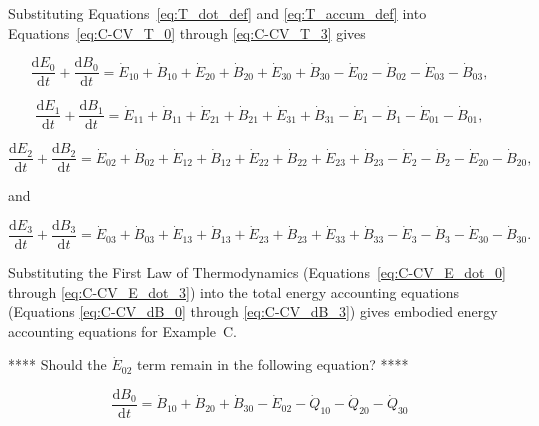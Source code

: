 Substituting Equations~\ref{eq:T_dot_def} 
and \ref{eq:T_accum_def} into 
Equations~\ref{eq:C-CV_T_0} through
\ref{eq:C-CV_T_3} gives

\begin{equation} \label{eq:C-CV_dB_0}
	\frac{\mathrm{d}E_{0}}{\mathrm{d}t}
	+ \frac{\mathrm{d}B_{0}}{\mathrm{d}t}
	= \dot{E}_{10} 
	+ \dot{B}_{10} 
	+ \dot{E}_{20} 
	+ \dot{B}_{20} 
	+ \dot{E}_{30} 
	+ \dot{B}_{30} 
	- \dot{E}_{02} 
	- \dot{B}_{02} 
	- \dot{E}_{03} 
	- \dot{B}_{03},
\end{equation}

\begin{equation} \label{eq:C-CV_dB_1}
	\frac{\mathrm{d}E_{1}}{\mathrm{d}t} 
	+ \frac{\mathrm{d}B_{1}}{\mathrm{d}t} 	 
	= \dot{E}_{11}
	+ \dot{B}_{11}
	+ \dot{E}_{21} 
	+ \dot{B}_{21} 
	+ \dot{E}_{31} 
	+ \dot{B}_{31} 
	- \dot{E}_{1}
	- \dot{B}_{1}
	- \dot{E}_{01} 
	- \dot{B}_{01},
\end{equation}

\begin{equation} \label{eq:C-CV_dB_2}
	\frac{\mathrm{d}E_{2}}{\mathrm{d}t} 
	+ \frac{\mathrm{d}B_{2}}{\mathrm{d}t} 	 
	= \dot{E}_{02} 
	+ \dot{B}_{02} 
	+ \dot{E}_{12}
	+ \dot{B}_{12}
	+ \dot{E}_{22} 
	+ \dot{B}_{22} 
	+ \dot{E}_{23} 
	+ \dot{B}_{23} 
	- \dot{E}_{2} 
	- \dot{B}_{2} 
	- \dot{E}_{20} 
	- \dot{B}_{20},
\end{equation}

\noindent and 

\begin{equation} \label{eq:C-CV_dB_3}
	\frac{\mathrm{d}E_{3}}{\mathrm{d}t} 
	+ \frac{\mathrm{d}B_{3}}{\mathrm{d}t} 	 
	= \dot{E}_{03} 
	+ \dot{B}_{03}
	+ \dot{E}_{13} 
	+ \dot{B}_{13} 
	+ \dot{E}_{23} 
	+ \dot{B}_{23}
	+ \dot{E}_{33} 
	+ \dot{B}_{33} 
	- \dot{E}_{3} 
	- \dot{B}_{3} 
	- \dot{E}_{30} 
	- \dot{B}_{30}.
\end{equation}

Substituting the First Law of Thermodynamics 
(Equations~\ref{eq:C-CV_E_dot_0} through \ref{eq:C-CV_E_dot_3}) 
into the total energy accounting equations 
(Equations \ref{eq:C-CV_dB_0} through \ref{eq:C-CV_dB_3}) 
gives embodied energy accounting equations for Example~C.

**** Should the $\dot{E}_{02}$ term remain in the following equation? ****

\begin{equation} \label{eq:C-embodied_acct_0}
	\frac{\mathrm{d}B_{0}}{\mathrm{d}t} 	 
	= \dot{B}_{10} 
	+ \dot{B}_{20} 
	+ \dot{B}_{30} 
	- \dot{E}_{02} 
	- \dot{Q}_{10} 
	- \dot{Q}_{20} 
	- \dot{Q}_{30}
\end{equation}

